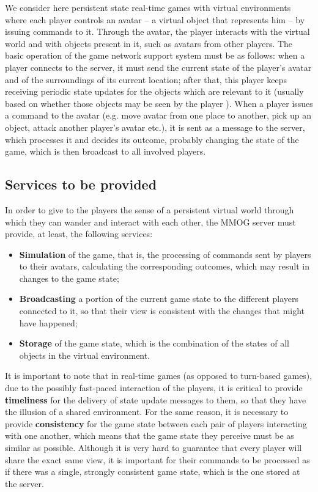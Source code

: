 \documentclass[]{usiinfprospectus}
\begin{document}
We consider here persistent state real-time games with virtual environments where each player controls an avatar -- a virtual object that represents him -- by issuing commands to it. Through the avatar, the player interacts with the virtual world and with objects present in it, such as avatars from other players. The basic operation of the game network support system must be as follows: when a player connects to the server, it must send the current state of the player's avatar and of the surroundings of its current location; after that, this player keeps receiving periodic state updates for the objects which are relevant to it (usually based on whether those objects may be seen by the player \cite{bezerra2008a3,ahmed2008dai,minson2005aim}). When a player issues a command to the avatar (e.g. move avatar from one place to another, pick up an object, attack another player's avatar etc.), it is sent as a message to the server, which processes it and decides its outcome, probably changing the state of the game, which is then broadcast to all involved players.

\subsection{Services to be provided} \label{sec:services}

In order to give to the players the sense of a persistent virtual world through which they can wander and interact with each other, the MMOG server must provide, at least, the following services:

\begin{itemize}
	\item \textbf{Simulation} of the game, that is, the processing of commands sent by players to their avatars, calculating the corresponding outcomes, which may result in changes to the game state;
	\item \textbf{Broadcasting} a portion of the current game state to the different players connected to it, so that their view is consistent with the changes that might have happened;
	\item \textbf{Storage} of the game state, which is the combination of the states of all objects in the virtual environment.
\end{itemize}

It is important to note that in real-time games (as opposed to turn-based games), due to the possibly fast-paced interaction of the players, it is critical to provide \textbf{timeliness} for the delivery of state update messages to them, so that they have the illusion of a shared environment. For the same reason, it is necessary to provide \textbf{consistency} for the game state between each pair of players interacting with one another, which means that the game state they perceive must be as similar as possible. Although it is very hard to guarantee that every player will share the exact same view, it is important for their commands to be processed as if there was a single, strongly consistent game state, which is the one stored at the server. 
\end{document}
